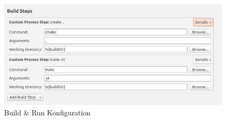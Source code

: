 \begin{figure}[H]
	\centering
	\includegraphics[scale=0.5]{images/setup-qtcreator-buildrun-config.png}
	\caption{Build \& Run Konfiguration}
\end{figure}

